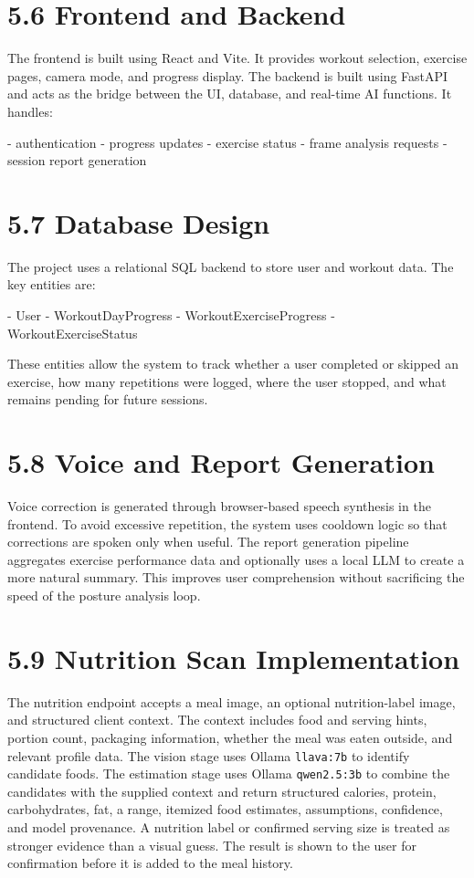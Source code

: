 \documentclass[12pt,a4paper]{report}
\begin{document}
\section{5.6 Frontend and Backend}
The frontend is built using React and Vite. It provides workout selection, exercise pages, camera mode, and progress display. The backend is built using FastAPI and acts as the bridge between the UI, database, and real-time AI functions. It handles:

- authentication  
- progress updates  
- exercise status  
- frame analysis requests  
- session report generation

\section{5.7 Database Design}
The project uses a relational SQL backend to store user and workout data. The key entities are:

- User  
- WorkoutDayProgress  
- WorkoutExerciseProgress  
- WorkoutExerciseStatus

These entities allow the system to track whether a user completed or skipped an exercise, how many repetitions were logged, where the user stopped, and what remains pending for future sessions.

\section{5.8 Voice and Report Generation}
Voice correction is generated through browser-based speech synthesis in the frontend. To avoid excessive repetition, the system uses cooldown logic so that corrections are spoken only when useful. The report generation pipeline aggregates exercise performance data and optionally uses a local LLM to create a more natural summary. This improves user comprehension without sacrificing the speed of the posture analysis loop.

\section{5.9 Nutrition Scan Implementation}
The nutrition endpoint accepts a meal image, an optional nutrition-label image, and structured client context. The context includes food and serving hints, portion count, packaging information, whether the meal was eaten outside, and relevant profile data. The vision stage uses Ollama \texttt{llava:7b} to identify candidate foods. The estimation stage uses Ollama \texttt{qwen2.5:3b} to combine the candidates with the supplied context and return structured calories, protein, carbohydrates, fat, a range, itemized food estimates, assumptions, confidence, and model provenance. A nutrition label or confirmed serving size is treated as stronger evidence than a visual guess. The result is shown to the user for confirmation before it is added to the meal history.
\end{document}
